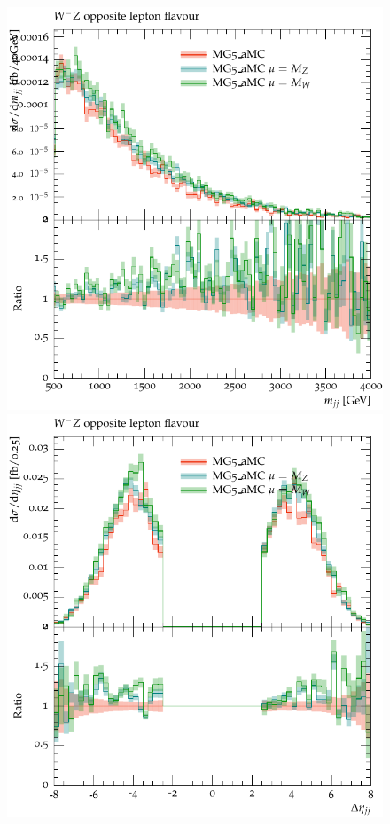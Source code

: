 \begin{figure}[htbp]
\begin{center}
   \includegraphics[scale=0.65]{figs/MG_WmZ_OF_mjj}
   \includegraphics[scale=0.65]{figs/MG_WmZ_OF_dEtajj}

\end{center}
\end{figure}
